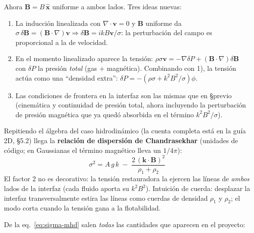 \documentclass[11pt,a4paper]{article}
\newcommand{\B}{\mathbf{B}}
\newcommand{\vct}{\mathbf{v}}
\newcommand{\term}[1]{\textbf{#1}}
\begin{document}
Ahora $\B=B\,\hat{\mathbf{x}}$ uniforme a ambos lados. Tres ideas nuevas:
\begin{enumerate}[nosep]
  \item La inducción linealizada con $\nabla\cdot\vct=0$ y $\B$ uniforme da
  $\sigma\,\delta\B=(\B\cdot\nabla)\vct \Rightarrow \delta\B=ikB\vct/\sigma$: la
  perturbación del campo es proporcional a la de velocidad.
  \item En el momento linealizado aparece la tensión:
  $\rho\sigma\vct=-\nabla\delta P+(\B\cdot\nabla)\delta\B$ con $\delta P$ la presión
  \emph{total} (gas $+$ magnética). Combinando con 1), la tensión actúa como una
  ``densidad extra'': $\delta P=-(\rho\sigma+k^2B^2/\sigma)\phi$.
  \item Las condiciones de frontera en la interfaz son las mismas que en \S previo
  (cinemática y continuidad de presión total, ahora incluyendo la perturbación de
  presión magnética que ya quedó absorbida en el término $k^2B^2/\sigma$).
\end{enumerate}
Repitiendo el álgebra del caso hidrodinámico (la cuenta completa está en la guía 2D,
\S5.2) llega la \term{relación de dispersión de Chandrasekhar} (unidades de código;
en Gaussianas el término magnético lleva un $1/4\pi$):
\begin{equation}
\boxed{\ \sigma^2 = A\,g\,k \;-\; \frac{2\,(\mathbf{k}\cdot\B)^2}{\rho_1+\rho_2}\ }
\label{eq:sigma-mhd}
\end{equation}
El factor 2 no es decorativo: la tensión restauradora la ejercen las líneas de \emph{ambos}
lados de la interfaz (cada fluido aporta su $k^2B^2$). Intuición de cuerda: desplazar la
interfaz transversalmente estira las líneas como cuerdas de densidad $\rho_1$ y $\rho_2$;
el modo corta cuando la tensión gana a la flotabilidad.

De la eq.~\eqref{eq:sigma-mhd} salen \emph{todas} las cantidades que aparecen en el
proyecto:
\end{document}

